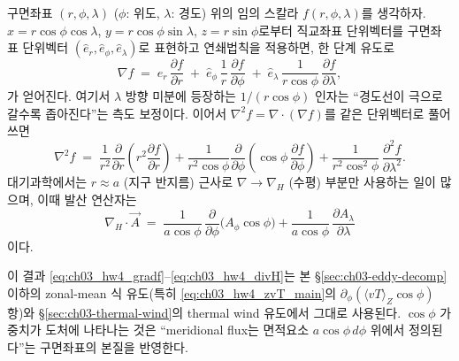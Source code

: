 \begin{example}
\label{ex:ch03_hw4_spherical}
구면좌표 $(r, \phi, \lambda)$ ($\phi$: 위도, $\lambda$: 경도) 위의 임의 스칼라 $f(r,\phi,\lambda)$를 생각하자.
$x = r\cos\phi\cos\lambda$, $y = r\cos\phi\sin\lambda$, $z = r\sin\phi$로부터
직교좌표 단위벡터를 구면좌표 단위벡터 $(\hat e_{r},\hat e_{\phi},\hat e_{\lambda})$로 표현하고
연쇄법칙을 적용하면, 한 단계 유도로
\begin{equation}
  \nabla f \;=\; \hat e_{r}\,\frac{\partial f}{\partial r}
            \;+\; \hat e_{\phi}\,\frac{1}{r}\,\frac{\partial f}{\partial \phi}
            \;+\; \hat e_{\lambda}\,\frac{1}{r\cos\phi}\,\frac{\partial f}{\partial \lambda},
  \label{eq:ch03_hw4_gradf}
\end{equation}
가 얻어진다.  여기서 $\lambda$ 방향 미분에 등장하는 $1/(r\cos\phi)$ 인자는
``경도선이 극으로 갈수록 좁아진다''는 측도 보정이다.  이어서
$\nabla^{2}f = \nabla\cdot(\nabla f)$를 같은 단위벡터로 풀어쓰면
\begin{equation}
  \nabla^{2} f \;=\; \frac{1}{r^{2}}\frac{\partial}{\partial r}\!\left(r^{2}\frac{\partial f}{\partial r}\right)
                 + \frac{1}{r^{2}\cos\phi}\frac{\partial}{\partial \phi}\!\left(\cos\phi\,\frac{\partial f}{\partial \phi}\right)
                 + \frac{1}{r^{2}\cos^{2}\phi}\,\frac{\partial^{2} f}{\partial \lambda^{2}}.
  \label{eq:ch03_hw4_lapf}
\end{equation}
대기과학에서는 $r \approx a$ (지구 반지름) 근사로 $\nabla \to \nabla_{H}$ (수평) 부분만 사용하는 일이 많으며,
이때 발산 연산자는
\begin{equation}
  \nabla_{H}\!\cdot\vec A \;=\; \frac{1}{a\cos\phi}\,\frac{\partial}{\partial\phi}\!\bigl(A_{\phi}\cos\phi\bigr)
                              + \frac{1}{a\cos\phi}\,\frac{\partial A_{\lambda}}{\partial\lambda}
  \label{eq:ch03_hw4_divH}
\end{equation}
이다.
\end{example}

\begin{hisublock}
이 결과 \eqref{eq:ch03_hw4_gradf}--\eqref{eq:ch03_hw4_divH}는 본 \S\ref{sec:ch03-eddy-decomp} 이하의
zonal-mean 식 유도(특히 \eqref{eq:ch03_hw4_zvT_main}의 $\partial_{\phi}(\langle vT\rangle_{Z}\cos\phi)$ 항)와
\S\ref{sec:ch03-thermal-wind}의 thermal wind 유도에서 그대로 사용된다.
$\cos\phi$ 가중치가 도처에 나타나는 것은 ``meridional flux는 면적요소 $a\cos\phi\,d\phi$ 위에서 정의된다''는
구면좌표의 본질을 반영한다.
\end{hisublock}

